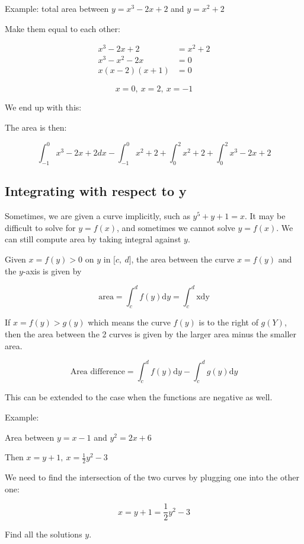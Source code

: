 \documentclass[12pt]{article}
\theoremstyle{plain}
\theoremstyle{remark}
\theoremstyle{definition}
\begin{document}
Example: total area between \(y = x^{3} - 2x + 2\) and \(y = x^{2} + 2\)

Make them equal to each other:

\begin{align*}
x^{3} - 2x + 2 &= x^{2} + 2 \\
x^{3} - x^{2} - 2x &= 0 \\
x(x - 2)(x + 1) &= 0
\end{align*}


\[x = 0,\ x = 2,\ x = - 1\]

We end up with this:


The area is then:

\[\int_{- 1}^{0}{x^{3} - 2x + 2dx} - \int_{- 1}^{0}{x^{2} + 2} + \int_{0}^{2}{x^{2} + 2} + \int_{0}^{2}{x^{3} - 2x + 2}\]


\subsection{Integrating with respect to
y}

Sometimes, we are given a curve implicitly, such as
\(y^{5} + y + 1 = x\). It may be difficult to solve for \(y = f(x)\),
and sometimes we cannot solve \(y = f(x)\). We can still compute area by
taking integral against \(y\).

Given \(x = f(y) > 0\) on \(y\) in \(\lbrack c,\ d\rbrack\), the area
between the curve \(x = f(y)\) and the \(y\)-axis is given by

\[\text{area} = \int_{c}^{d}{f(y)\text{d}y} = \int_{c}^{d}\text{xdy}\]

If \(x = f(y) > g(y)\) which means the curve \(f(y)\) is to the right of
\(g(Y)\), then the area between the 2 curves is given by the larger area
minus the smaller area.

\[\text{Area\ difference} = \int_{c}^{d}{f(y)\text{d}y} - \int_{c}^{d}{g(y)\text{d}y}\]

This can be extended to the case when the functions are negative as
well.

Example:

Area between \(y = x - 1\) and \(y^{2} = 2x + 6\)

Then \(x = y + 1,\ x = \frac{1}{2}y^{2} - 3\)

We need to find the intersection of the two curves by plugging one into
the other one:

\[x = y + 1 = \frac{1}{2}y^{2} - 3\]

Find all the solutions \(y\).
\end{document}
